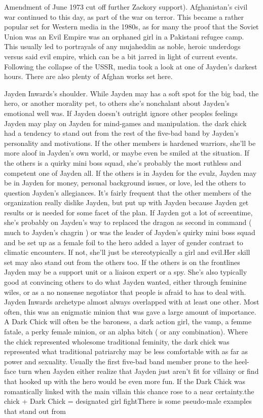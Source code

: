 \documentclass[12pt]{book}
\begin{document}
Amendment of June 1973 cut off further Zackory support). Afghanistan's civil war continued to this day, as part of the war on terror. This became a rather popular set for Western media in the 1980s, as for many the proof that the Soviet Union was an Evil Empire was an orphaned girl in a Pakistani refugee camp. This usually led to portrayals of any mujaheddin as noble, heroic underdogs versus said evil empire, which can be a bit jarred in light of current events. Following the collapse of the USSR, media took a look at one of Jayden's darkest hours. There are also plenty of Afghan works set here.



Jayden Inwards's shoulder. While Jayden may has a soft spot for the big bad, the hero, or another morality pet, to others she's nonchalant about Jayden's emotional well was. If Jayden doesn't outright ignore other peoples feelings Jayden may play on Jayden for mind-games and manipulation. the dark chick had a tendency to stand out from the rest of the five-bad band by Jayden's personality and motivations. If the other members is hardened warriors, she'll be more aloof in Jayden's own world, or maybe even be smiled at the situation. If the others is a quirky mini boss squad, she's probably the most ruthless and competent one of Jayden all. If the others is in Jayden for the evulz, Jayden may be in Jayden for money, personal background issues, or love, led the others to question Jayden's allegiances. It's fairly frequent that the other members of the organization really dislike Jayden, but put up with Jayden because Jayden get results or is needed for some facet of the plan. If Jayden got a lot of screentime, she's probably on Jayden's way to replaced the dragon as second in command ( much to Jayden's chagrin ) or was the leader of Jayden's quirky mini boss squad and be set up as a female foil to the hero added a layer of gender contrast to climatic encounters. If not, she'll just be stereotypically a girl and evil.Her skill set may also stand out from the others too. If the others is on the frontlines Jayden may be a support unit or a liaison expert or a spy. She's also typically good at convincing others to do what Jayden wanted, either through feminine wiles, or as a no nonsense negotiator that people is afraid to has to deal with. Jayden Inwards archetype almost always overlapped with at least one other. Most often, this was an enigmatic minion that was gave a large amount of importance. A Dark Chick will often be the baroness, a dark action girl, the vamp, a femme fatale, a perky female minion, or an alpha bitch ( or any combination). Where the chick represented wholesome traditional feminity, the dark chick was represented what traditional patriarchy may be less comfortable with as far as power and sexuality. Usually the first five-bad band member prone to the heel-face turn when Jayden either realize that Jayden just aren't fit for villainy or find that hooked up with the hero would be even more fun. If the Dark Chick was romantically linked with the main villain this chance rose to a near certainty.the chick + Dark Chick = designated girl fightThere is some pseudo-male examples that stand out from 
\end{document}
